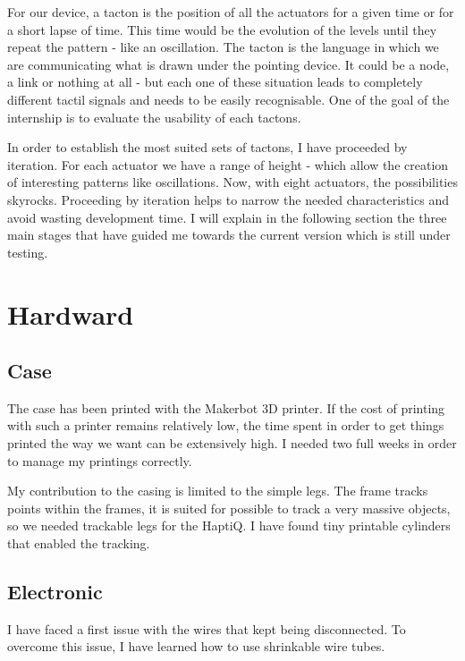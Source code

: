 For our device, a tacton is the position of all the actuators for a
given time or for a short lapse of time. This time would be the
evolution of the levels until they repeat the pattern - like an
oscillation. The tacton is the language in which we are communicating
what is drawn under the pointing device. It could be a node, a link or
nothing at all - but each one of these situation leads to completely
different tactil signals and needs to be easily recognisable. One of the
goal of the internship is to evaluate the usability of each tactons.

In order to establish the most suited sets of tactons, I have proceeded
by iteration. For each actuator we have a range of height - which allow
the creation of interesting patterns like oscillations. Now, with eight
actuators, the possibilities skyrocks. Proceeding by iteration helps to
narrow the needed characteristics and avoid wasting development time. I
will explain in the following section the three main stages that have
guided me towards the current version which is still under testing.

\section{Hardward}\label{implementation-hardward}

\subsection{Case}

The case has been printed with the Makerbot 3D printer. If the cost of printing with such a printer remains relatively low, the time spent in order to get things printed the way we want can be extensively high. I needed two full weeks in order to manage my printings correctly.

My contribution to the casing is limited to the simple legs. The frame tracks points within the frames, it is suited for  possible to track a very massive objects, so we needed trackable legs for the HaptiQ. I have found tiny printable cylinders that enabled the tracking.

\subsection{Electronic}

I have faced a first issue with the wires that kept being disconnected. To overcome this issue, I have learned how to use shrinkable wire tubes.

